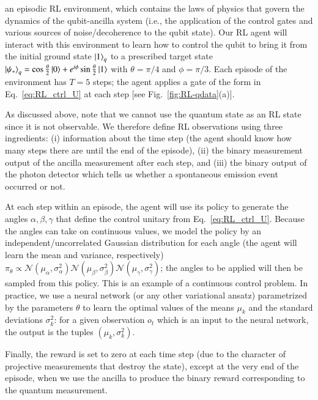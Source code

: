  an episodic RL environment, which contains the laws of physics that govern the dynamics of the qubit-ancilla system (i.e., the application of the control gates and various sources of noise/decoherence to the qubit state). Our RL agent will interact with this environment to learn how to control the qubit to bring it from the initial ground state $\ket{1}_q$ to a prescribed target state $\ket{\psi_\ast}_q = \cos\frac{\theta}{2}\ket{0}+e^{i\phi}\sin\frac{\theta}{2}\ket{1}$ with $\theta=\pi/4$ and $\phi=\pi/3$. Each episode of the environment has $T=5$ steps; the agent applies a gate of the form in Eq.~\eqref{eq:RL_ctrl_U} at each step [see Fig.~\ref{fig:RL-qdata}(a)]. 

As discussed above, note that we cannot use the quantum state as an RL state since it is not observable. We therefore define RL observations using three ingredients: (i) information about the time step (the agent should know how many steps there are until the end of the episode), (ii) the binary measurement output of the ancilla measurement after each step, and (iii) the binary output of the photon detector which tells us whether a spontaneous emission event occurred or not. 

At each step within an episode, the agent will use its policy to generate the angles $\alpha,\beta,\gamma$ that define the control unitary from Eq.~\eqref{eq:RL_ctrl_U}. Because the angles can take on continuous values, we model the policy by an independent/uncorrelated Gaussian distribution for each angle (the agent will learn the mean and variance, respectively) $\pi_\theta\propto \mathcal{N}(\mu_\alpha,\sigma_\alpha^2)\mathcal{N}(\mu_\beta,\sigma_\beta^2)\mathcal{N}(\mu_\gamma,\sigma_\gamma^2)$; the angles to be applied will then be sampled from this policy. This is an example of a continuous control problem. In practice, we use a neural network (or any other variational ansatz) parametrized by the parameters $\theta$ to learn the optimal values of the means $\mu_k$ and the standard deviations $\sigma^2_k$: for a given observation $o_t$ which is an input to the neural network, the output is the tuples $(\mu_k, \sigma^2_k)$. 

Finally, the reward is set to zero at each time step (due to the character of projective measurements that destroy the state), except at the very end of the episode, when we use the ancilla to produce the binary reward corresponding to the quantum measurement. 

